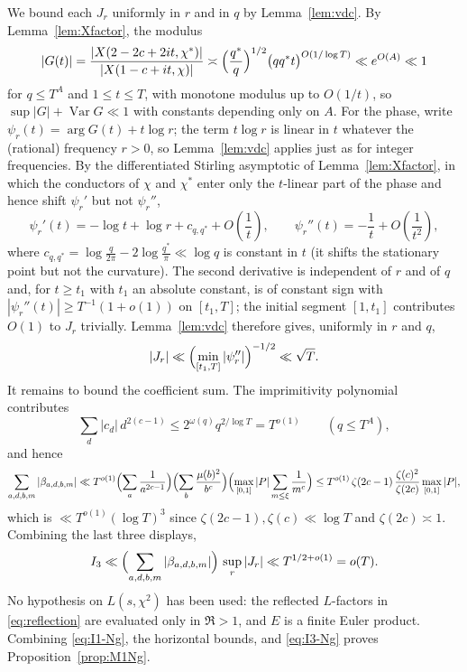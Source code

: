 \documentclass[10pt,a4paper]{amsart}
\numberwithin{equation}{section}
\begin{document}
We bound each $J_r$ uniformly in $r$ and in $q$ by Lemma~\ref{lem:vdc}. By Lemma~\ref{lem:Xfactor}, the modulus
\[
|G(t)|=\frac{|X(2-2c+2it,\chi^*)|}{|X(1-c+it,\chi)|}\asymp\Bigl(\frac{q^*}{q}\Bigr)^{1/2}\bigl(qq^*t\bigr)^{O(1/\log T)}\ll e^{O(A)}\ll1
\]
for $q\le T^{A}$ and $1\le t\le T$, with monotone modulus up to $O(1/t)$, so $\sup|G|+\operatorname{Var}G\ll1$ with constants depending only on $A$. For the phase, write $\psi_r(t)=\arg G(t)+t\log r$; the term $t\log r$ is linear in $t$ whatever the (rational) frequency $r>0$, so Lemma~\ref{lem:vdc} applies just as for integer frequencies. By the differentiated Stirling asymptotic of Lemma~\ref{lem:Xfactor}, in which the conductors of $\chi$ and $\chi^*$ enter only the $t$-linear part of the phase and hence shift $\psi_r'$ but not $\psi_r''$,
\[
\psi_r'(t)=-\log t+\log r+c_{q,q^*}+O\!\left(\frac1t\right),
\qquad
\psi_r''(t)=-\frac1t+O\!\left(\frac1{t^2}\right),
\]
where $c_{q,q^*}=\log\frac{q}{2\pi}-2\log\frac{q^*}{\pi}\ll\log q$ is constant in $t$ (it shifts the stationary point but not the curvature). The second derivative is independent of $r$ and of $q$ and, for $t\ge t_1$ with $t_1$ an absolute constant, is of constant sign with $|\psi_r''(t)|\ge T^{-1}(1+o(1))$ on $[t_1,T]$; the initial segment $[1,t_1]$ contributes $O(1)$ to $J_r$ trivially. Lemma~\ref{lem:vdc} therefore gives, uniformly in $r$ and $q$,
\[
|J_r|\ll\Bigl(\min_{[t_1,T]}|\psi_r''|\Bigr)^{-1/2}\ll\sqrt T .
\]
It remains to bound the coefficient sum. The imprimitivity polynomial contributes
\[
\sum_d|c_d|\,d^{2(c-1)}\le2^{\omega(q)}q^{2/\log T}=T^{o(1)}
\qquad(q\le T^{A}),
\]
and hence
\[
\sum_{a,d,b,m}|\beta_{a,d,b,m}|
\ll T^{o(1)}\Bigl(\sum_a \frac{1}{a^{2c-1}}\Bigr)\Bigl(\sum_b\frac{\mu(b)^2}{b^{c}}\Bigr)\Bigl(\max_{[0,1]}|P|\sum_{m\le\xi}\frac{1}{m^{c}}\Bigr)
\le T^{o(1)}\,\zeta(2c-1)\,\frac{\zeta(c)^2}{\zeta(2c)}\max_{[0,1]}|P| ,
\]
which is $\ll T^{o(1)}(\log T)^3$ since $\zeta(2c-1),\zeta(c)\ll\log T$ and $\zeta(2c)\asymp1$. Combining the last three displays,
\begin{equation}\label{eq:I3-Ng}
I_3\ll\Bigl(\sum_{a,d,b,m}|\beta_{a,d,b,m}|\Bigr)\,\sup_{r}|J_r|\ll T^{1/2+o(1)}=o(T).
\end{equation}
No hypothesis on $L(s,\chi^2)$ has been used: the reflected $L$-factors in \eqref{eq:reflection} are evaluated only in $\Re>1$, and $E$ is a finite Euler product. Combining \eqref{eq:I1-Ng}, the horizontal bounds, and \eqref{eq:I3-Ng} proves Proposition~\ref{prop:M1Ng}.
\end{document}
